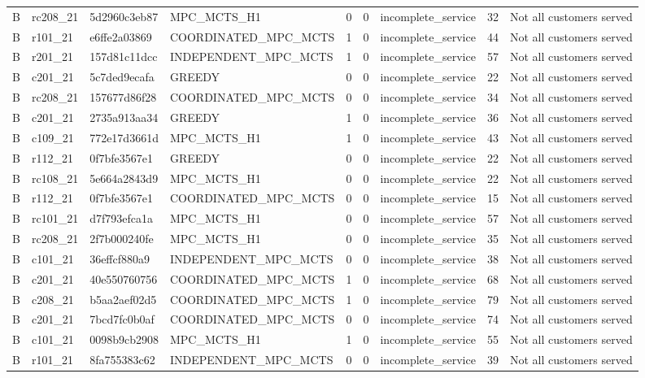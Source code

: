 \begin{table}
{\begin{tabular}{llllrrlrl}
B & rc208\_21 & 5d2960c3eb87 & MPC\_MCTS\_H1 & 0 & 0 & incomplete\_service & 32 & Not all customers served \\
B & r101\_21 & e6ffe2a03869 & COORDINATED\_MPC\_MCTS & 1 & 0 & incomplete\_service & 44 & Not all customers served \\
B & r201\_21 & 157d81c11dcc & INDEPENDENT\_MPC\_MCTS & 1 & 0 & incomplete\_service & 57 & Not all customers served \\
B & c201\_21 & 5c7ded9ecafa & GREEDY & 0 & 0 & incomplete\_service & 22 & Not all customers served \\
B & rc208\_21 & 157677d86f28 & COORDINATED\_MPC\_MCTS & 0 & 0 & incomplete\_service & 34 & Not all customers served \\
B & c201\_21 & 2735a913aa34 & GREEDY & 1 & 0 & incomplete\_service & 36 & Not all customers served \\
B & c109\_21 & 772e17d3661d & MPC\_MCTS\_H1 & 1 & 0 & incomplete\_service & 43 & Not all customers served \\
B & r112\_21 & 0f7bfe3567e1 & GREEDY & 0 & 0 & incomplete\_service & 22 & Not all customers served \\
B & rc108\_21 & 5e664a2843d9 & MPC\_MCTS\_H1 & 0 & 0 & incomplete\_service & 22 & Not all customers served \\
B & r112\_21 & 0f7bfe3567e1 & COORDINATED\_MPC\_MCTS & 0 & 0 & incomplete\_service & 15 & Not all customers served \\
B & rc101\_21 & d7f793efca1a & MPC\_MCTS\_H1 & 0 & 0 & incomplete\_service & 57 & Not all customers served \\
B & rc208\_21 & 2f7b000240fe & MPC\_MCTS\_H1 & 0 & 0 & incomplete\_service & 35 & Not all customers served \\
B & c101\_21 & 36effcf880a9 & INDEPENDENT\_MPC\_MCTS & 0 & 0 & incomplete\_service & 38 & Not all customers served \\
B & c201\_21 & 40e550760756 & COORDINATED\_MPC\_MCTS & 1 & 0 & incomplete\_service & 68 & Not all customers served \\
B & c208\_21 & b5aa2aef02d5 & COORDINATED\_MPC\_MCTS & 1 & 0 & incomplete\_service & 79 & Not all customers served \\
B & c201\_21 & 7bcd7fc0b0af & COORDINATED\_MPC\_MCTS & 0 & 0 & incomplete\_service & 74 & Not all customers served \\
B & c101\_21 & 0098b9cb2908 & MPC\_MCTS\_H1 & 1 & 0 & incomplete\_service & 55 & Not all customers served \\
B & r101\_21 & 8fa755383c62 & INDEPENDENT\_MPC\_MCTS & 0 & 0 & incomplete\_service & 39 & Not all customers served \\

\end{tabular}}
\end{table}
